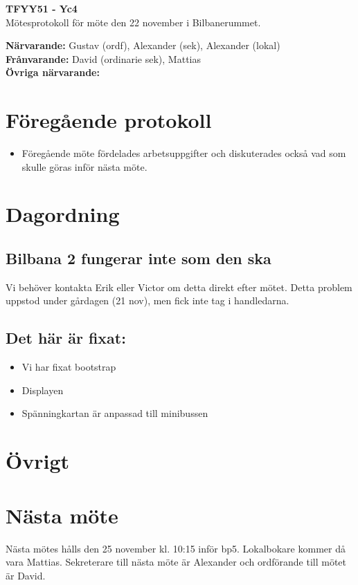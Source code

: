\documentclass[11pt,a4paper]{article}
\begin{document}
    \begin{center}
        \textbf{\Large TFYY51 - Yc4} \\[0.2em]
        Mötesprotokoll för möte den 22 november i Bilbanerummet.
    \end{center}
    \vspace{1em}
    \textbf{Närvarande:} Gustav (ordf), Alexander (sek), Alexander (lokal) \\[0.5em]
    \textbf{Frånvarande:} David (ordinarie sek), Mattias \\[0.5em]  %
    \textbf{Övriga närvarande:}

    \section*{Föregående protokoll}
    \begin{itemize}
        \item Föregående möte fördelades arbetsuppgifter och diskuterades också vad som skulle göras inför nästa möte.\
    \end{itemize}

    \section*{Dagordning}
    \subsection*{Bilbana 2 fungerar inte som den ska}
	    Vi behöver kontakta Erik eller Victor om detta direkt efter mötet. Detta problem uppstod under gårdagen (21 nov), men fick inte tag i handledarna.
	    \subsection*{Det här är fixat:}
	     
	    \begin{itemize}
	    	\item Vi har fixat bootstrap
	    	\item Displayen
	    	\item Spänningkartan är anpassad till minibussen
	    \end{itemize}
    \section*{Övrigt}
    

    \section*{Nästa möte}
    Nästa mötes hålls den 25 november kl. 10:15 inför bp5. Lokalbokare kommer då vara Mattias. Sekreterare till nästa möte är Alexander och ordförande till mötet är David.  
\end{document}
